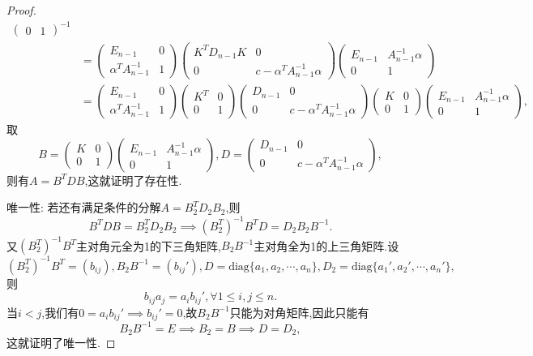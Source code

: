 \documentclass[../../main.tex]{subfiles}
\begin{document}
\begin{proof}
\[\begin{aligned}
\begin{pmatrix}
0 & 1
\end{pmatrix}^{-1} \\
&= \begin{pmatrix}
E_{n - 1} & 0 \\
\alpha^T A_{n - 1}^{-1} & 1
\end{pmatrix} \begin{pmatrix}
K^T D_{n - 1} K & 0 \\
0 & c - \alpha^T A_{n - 1}^{-1} \alpha
\end{pmatrix} \begin{pmatrix}
E_{n - 1} & A_{n - 1}^{-1} \alpha \\
0 & 1
\end{pmatrix} \\
&= \begin{pmatrix}
E_{n - 1} & 0 \\
\alpha^T A_{n - 1}^{-1} & 1
\end{pmatrix} \begin{pmatrix}
K^T & 0 \\
0 & 1
\end{pmatrix} \begin{pmatrix}
D_{n - 1} & 0 \\
0 & c - \alpha^T A_{n - 1}^{-1} \alpha
\end{pmatrix} \begin{pmatrix}
K & 0 \\
0 & 1
\end{pmatrix} \begin{pmatrix}
E_{n - 1} & A_{n - 1}^{-1} \alpha \\
0 & 1
\end{pmatrix},
\end{aligned}
\]
取
\[
B = \begin{pmatrix}
K & 0 \\
0 & 1
\end{pmatrix} \begin{pmatrix}
E_{n - 1} & A_{n - 1}^{-1} \alpha \\
0 & 1
\end{pmatrix}, D = \begin{pmatrix}
D_{n - 1} & 0 \\
0 & c - \alpha^T A_{n - 1}^{-1} \alpha
\end{pmatrix},
\]
则有\( A = B^T D B \),这就证明了存在性.

{\heiti 唯一性:} 若还有满足条件的分解\( A = B_2^T D_2 B_2 \),则
\[
B^T D B = B_2^T D_2 B_2 \implies (B_2^T)^{-1} B^T D = D_2 B_2 B^{-1}.
\]
又\( (B_2^T)^{-1} B^T \)主对角元全为1的下三角矩阵,\( B_2 B^{-1} \)主对角全为1的上三角矩阵.设
\[
(B_2^T)^{-1} B^T = (b_{ij}), B_2 B^{-1} = (b_{ij}'), D = \text{diag}\{a_1, a_2, \cdots, a_n\}, D_2 = \text{diag}\{a_1', a_2', \cdots, a_n'\},
\]
则
\[
b_{ij} a_j = a_i b_{ij}', \forall 1 \leqslant  i, j \leqslant  n.
\]
当\( i < j \),我们有\( 0 = a_i b_{ij}' \implies b_{ij}' = 0 \),故\( B_2 B^{-1} \)只能为对角矩阵,因此只能有
\[
B_2 B^{-1} = E \implies B_2 = B \implies D = D_2,
\]
这就证明了唯一性.

\end{proof}
\end{document}
